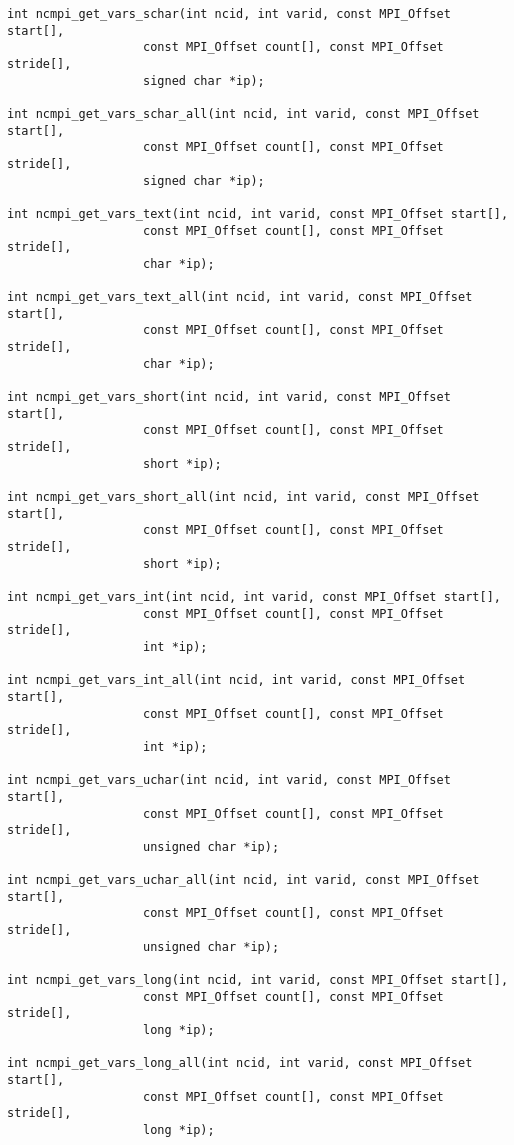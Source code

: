 \begin{verbatim}
int ncmpi_get_vars_schar(int ncid, int varid, const MPI_Offset start[],
                   const MPI_Offset count[], const MPI_Offset stride[],
                   signed char *ip); 

int ncmpi_get_vars_schar_all(int ncid, int varid, const MPI_Offset start[],
                   const MPI_Offset count[], const MPI_Offset stride[],
                   signed char *ip); 

int ncmpi_get_vars_text(int ncid, int varid, const MPI_Offset start[],
                   const MPI_Offset count[], const MPI_Offset stride[],
                   char *ip); 

int ncmpi_get_vars_text_all(int ncid, int varid, const MPI_Offset start[],
                   const MPI_Offset count[], const MPI_Offset stride[],
                   char *ip); 

int ncmpi_get_vars_short(int ncid, int varid, const MPI_Offset start[],
                   const MPI_Offset count[], const MPI_Offset stride[],
                   short *ip); 

int ncmpi_get_vars_short_all(int ncid, int varid, const MPI_Offset start[],
                   const MPI_Offset count[], const MPI_Offset stride[],
                   short *ip); 

int ncmpi_get_vars_int(int ncid, int varid, const MPI_Offset start[],
                   const MPI_Offset count[], const MPI_Offset stride[],
                   int *ip); 

int ncmpi_get_vars_int_all(int ncid, int varid, const MPI_Offset start[],
                   const MPI_Offset count[], const MPI_Offset stride[],
                   int *ip); 

int ncmpi_get_vars_uchar(int ncid, int varid, const MPI_Offset start[],
                   const MPI_Offset count[], const MPI_Offset stride[],
                   unsigned char *ip);

int ncmpi_get_vars_uchar_all(int ncid, int varid, const MPI_Offset start[],
                   const MPI_Offset count[], const MPI_Offset stride[],
                   unsigned char *ip); 

int ncmpi_get_vars_long(int ncid, int varid, const MPI_Offset start[],
                   const MPI_Offset count[], const MPI_Offset stride[],
                   long *ip);

int ncmpi_get_vars_long_all(int ncid, int varid, const MPI_Offset start[],
                   const MPI_Offset count[], const MPI_Offset stride[],
                   long *ip); 


\end{verbatim}
